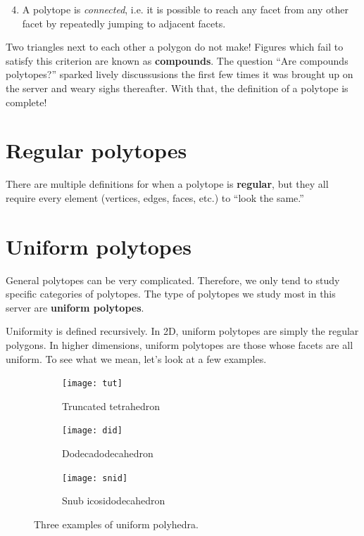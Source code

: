 \documentclass{article}
\begin{document}
\begin{enumerate}
  \setcounter{enumi}{3}
\item
  A polytope is \textit{connected}, i.e.
  it is possible to reach any facet from any other facet
  by repeatedly jumping to adjacent facets.
\end{enumerate}

Two triangles next to each other a polygon do not make!
Figures which fail to satisfy this criterion are known as \textbf{compounds}.
The question ``Are compounds polytopes?'' sparked lively discussusions
the first few times it was brought up on the server
and weary sighs thereafter.
With that, the definition of a polytope is complete!

\section{Regular polytopes}
There are multiple definitions for when a polytope is \textbf{regular},
but they all require every element (vertices, edges, faces, etc.) to ``look the same.''

\section{Uniform polytopes}
General polytopes can be very complicated. Therefore, we only tend to study specific categories of polytopes. The type of polytopes we study most in this server are \textbf{uniform polytopes}.

Uniformity is defined recursively. In 2D, uniform polytopes are simply the regular polygons.
In higher dimensions, uniform polytopes are those whose facets are all uniform. To see what we mean, let's look at a few examples.

\begin{figure}[H]
  \centering
  \begin{subfigure}{.33333\textwidth}
    \centering
    \texttt{[image: tut]}
    \caption{Truncated tetrahedron}
    \label{fig:tut}
  \end{subfigure}%
  \begin{subfigure}{.33333\textwidth}
    \centering
    \texttt{[image: did]}
    \caption{Dodecadodecahedron}
    \label{fig:did}
  \end{subfigure}%
  \begin{subfigure}{.33333\textwidth}
    \centering
    \texttt{[image: snid]}
    \caption{Snub icosidodecahedron}
    \label{fig:snid}
  \end{subfigure}%
  \caption{Three examples of uniform polyhedra.}
  \label{fig:uniforms3D}
\end{figure}
\end{document}

